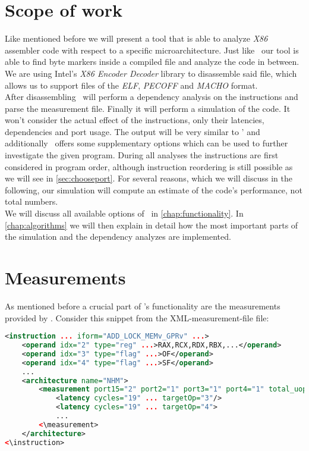  
\section{Scope of work}

Like mentioned before we will present a tool that is able to analyze \emph{X86} assembler code with respect to a specific microarchitecture. Just like \iaca\ our tool is able to find byte markers inside a compiled file and analyze the code in between.  We are using Intel's \emph{X86 Encoder Decoder} library \cite{xed} to disassemble said file, which allows us to support files of the \emph{ELF}, \emph{PECOFF} and \emph{MACHO} format.\\

After disassembling \suaca\ will perform a dependency analysis on the instructions and parse the measurement file. Finally it will perform a simulation of the code. It won't consider the actual effect of the instructions, only their latencies, dependencies and port usage. The output will be very similar to \iaca' and additionally \suaca\ offers some supplementary options which can be used to further investigate the given program. During all analyses the instructions are first considered in program order, although instruction reordering is still possible as we will see in \autoref{sec:chooseport}. For several reasons, which we will discuss in the following, our simulation will compute an estimate of the code's performance, not total numbers.\\
We will discuss all available options of \suaca\ in \autoref{chap:functionality}. In \autoref{chap:algorithms} we will then explain in detail how the most important parts of the simulation and the dependency analyzes are implemented.



\section{Measurements}
\label{sec:measurements}

As mentioned before a crucial part of \suaca's functionality are the measurements provided by \cite{Andreas}. Consider this snippet from the XML-measurement-file file:


\begin{lstlisting}[language=XML, basicstyle=\ttfamily\scriptsize, breaklines=false]
<instruction ... iform="ADD_LOCK_MEMv_GPRv" ...>
    <operand idx="2" type="reg" ...>RAX,RCX,RDX,RBX,...</operand>
    <operand idx="3" type="flag" ...>OF</operand>
    <operand idx="4" type="flag" ...>SF</operand>
    ...
    <architecture name="NHM">
        <measurement port15="2" port2="1" port3="1" port4="1" total_uops="5">
            <latency cycles="19" ... targetOp="3"/>
            <latency cycles="19" ... targetOp="4">
            ...
        <\measurement>
    </architecture>
<\instruction>
\end{lstlisting}


